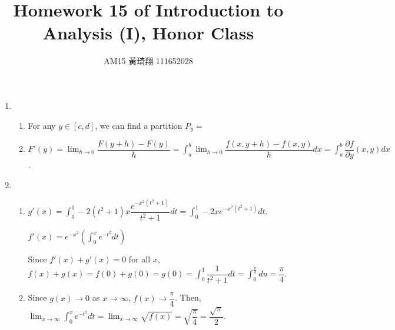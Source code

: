 \documentclass[12pt]{article}
\title{Homework 15 of Introduction to Analysis (I), Honor Class}
\author{AM15 黃琦翔 111652028}
\begin{document}
\maketitle
\begin{enumerate}
    \item \begin{enumerate}
        \item For any $y\in [c, d]$, we can find a partition $P_y = $

        \item $F'(y) = \displaystyle\lim_{h\to 0} \dfrac{F(y+h) - F(y)}{h} = \displaystyle\int_a^b \displaystyle\lim_{h\to 0} \dfrac{f(x, y+h) - f(x, y)}{h} dx = \displaystyle\int_a^b \dfrac{\partial f}{\partial y}(x, y) dx$.
    \end{enumerate}

    \item\begin{enumerate}
        \item $g'(x) = \displaystyle\int_0^1 -2(t^2+1)x\dfrac{e^{-x^2(t^2 + 1)}}{t^2+1}dt = \displaystyle\int_0^1 -2xe^{-x^2(t^2+1)} dt$.
        
        $f'(x) = e^{-x^2}(\displaystyle\int_0^x e^{-t^2} dt)$

        Since $f'(x) + g'(x) = 0$ for all $x$, $f(x) + g(x) = f(0) + g(0) = g(0) = \displaystyle\int_0^1 \dfrac{1}{t^2 + 1} dt =\displaystyle\int_0^\frac{\pi}{4} du = \dfrac{\pi}{4}$.

        \item Since $g(x) \to 0$ as $x \to \infty$, $f(x) \to \dfrac{\pi}{4}$.
        Then, $\displaystyle\lim_{x\to\infty} \displaystyle\int_0^x e^{-t^2} dt = \displaystyle\lim_{x\to\infty} \sqrt{f(x)} = \sqrt{\dfrac{\pi}{4}} = \dfrac{\sqrt{\pi}}{2}$.
    \end{enumerate}
    
\end{enumerate}
\end{document}
